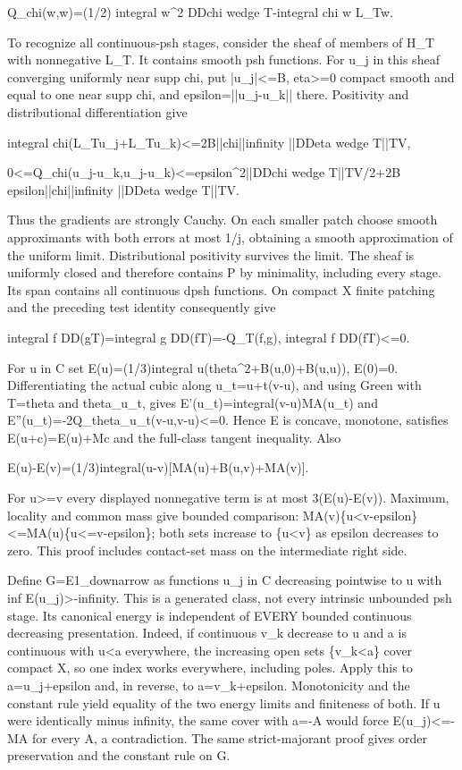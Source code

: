 \documentclass[11pt]{article}
\begin{document}
Q\_chi(w,w)=(1/2) integral w\textasciicircum{}2 DDchi wedge T-integral chi w L\_Tw.

To recognize all continuous-psh stages, consider the sheaf of members of H\_T with nonnegative L\_T. It contains smooth psh functions. For u\_j in this sheaf converging uniformly near supp chi, put |u\_j|<=B, eta>=0 compact smooth and equal to one near supp chi, and epsilon=||u\_j-u\_k|| there. Positivity and distributional differentiation give

integral chi(L\_Tu\_j+L\_Tu\_k)<=2B||chi||infinity ||DDeta wedge T||TV,

0<=Q\_chi(u\_j-u\_k,u\_j-u\_k)<=epsilon\textasciicircum{}2||DDchi wedge T||TV/2+2B epsilon||chi||infinity ||DDeta wedge T||TV.

Thus the gradients are strongly Cauchy. On each smaller patch choose smooth approximants with both errors at most 1/j, obtaining a smooth approximation of the uniform limit. Distributional positivity survives the limit. The sheaf is uniformly closed and therefore contains P by minimality, including every stage. Its span contains all continuous dpsh functions. On compact X finite patching and the preceding test identity consequently give

integral f DD(gT)=integral g DD(fT)=-Q\_T(f,g), integral f DD(fT)<=0.

For u in C set E(u)=(1/3)integral u(theta\textasciicircum{}2+B(u,0)+B(u,u)), E(0)=0. Differentiating the actual cubic along u\_t=u+t(v-u), and using Green with T=theta and theta\_u\_t, gives E'(u\_t)=integral(v-u)MA(u\_t) and E''(u\_t)=-2Q\_theta\_u\_t(v-u,v-u)<=0. Hence E is concave, monotone, satisfies E(u+c)=E(u)+Mc and the full-class tangent inequality. Also

E(u)-E(v)=(1/3)integral(u-v)[MA(u)+B(u,v)+MA(v)].

For u>=v every displayed nonnegative term is at most 3(E(u)-E(v)). Maximum, locality and common mass give bounded comparison: MA(v)\{u<v-epsilon\}<=MA(u)\{u<=v-epsilon\}; both sets increase to \{u<v\} as epsilon decreases to zero. This proof includes contact-set mass on the intermediate right side.

Define G=E1\_downarrow as functions u\_j in C decreasing pointwise to u with inf E(u\_j)>-infinity. This is a generated class, not every intrinsic unbounded psh stage. Its canonical energy is independent of EVERY bounded continuous decreasing presentation. Indeed, if continuous v\_k decrease to u and a is continuous with u<a everywhere, the increasing open sets \{v\_k<a\} cover compact X, so one index works everywhere, including poles. Apply this to a=u\_j+epsilon and, in reverse, to a=v\_k+epsilon. Monotonicity and the constant rule yield equality of the two energy limits and finiteness of both. If u were identically minus infinity, the same cover with a=-A would force E(u\_j)<=-MA for every A, a contradiction. The same strict-majorant proof gives order preservation and the constant rule on G.
\end{document}
